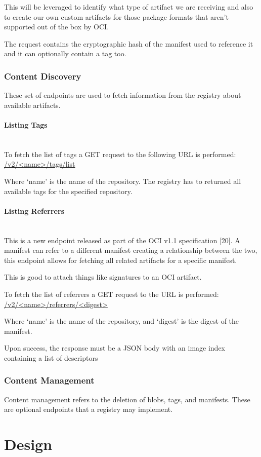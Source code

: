 \documentclass{article}
\newcommand{\subsubsubsection}[1]{\paragraph{#1}\mbox{}\\}
\begin{document}
  This will be leveraged to identify what type of artifact we are receiving and also to create our own custom artifacts for those package formats that aren't supported out of the box by OCI.

  The request contains the cryptographic hash of the manifest used to reference it and it can optionally contain a tag too.

  \subsubsection{Content Discovery}

  These set of endpoints are used to fetch information from the registry about available artifacts.

  \subsubsubsection{Listing Tags}

  To fetch the list of tags a GET request to the following URL is performed: \url{/v2/<name>/tags/list}

  Where `name' is the name of the repository. The registry has to returned all available tags for the specified repository.

  \subsubsubsection{Listing Referrers}

  This is a new endpoint released as part of the OCI v1.1 specification [20]. A manifest can refer to a different manifest creating a relationship between the two, this endpoint allows for fetching all related artifacts for a specific manifest.
  
  This is good to attach things like signatures to an OCI artifact.

  To fetch the list of referrers a GET request to the URL is performed: \url{/v2/<name>/referrers/<digest>}

  Where `name' is the name of the repository, and `digest' is the digest of the manifest.

  Upon success, the response must be a JSON body with an image index containing a list of descriptors

  \subsubsection{Content Management}

  Content management refers to the deletion of blobs, tags, and manifests. These are optional endpoints that a registry may implement.


  \section{Design}
\end{document}
